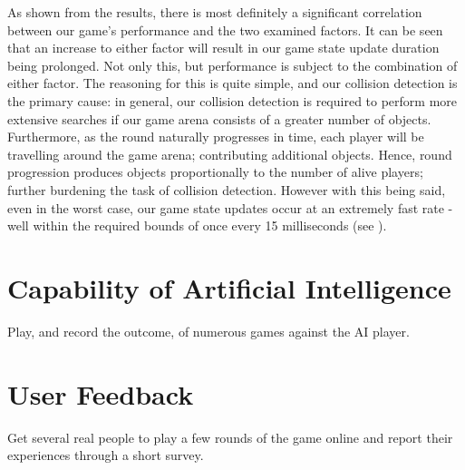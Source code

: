 \documentclass{standalone}
\begin{document}
			As shown from the results, there is most definitely a significant correlation between our game's performance and the two examined factors. It can be seen that an increase to either factor will result in our game state update duration being prolonged. Not only this, but performance is subject to the combination of either factor. The reasoning for this is quite simple, and our collision detection is the primary cause: in general, our collision detection is required to perform more extensive searches if our game arena consists of a greater number of objects. Furthermore, as the round naturally progresses in time, each player will be travelling around the game arena; contributing additional objects. Hence, round progression produces objects proportionally to the number of alive players; further burdening the task of collision detection. However with this being said, even in the worst case, our game state updates occur at an extremely fast rate - well within the required bounds of once every 15 milliseconds (see ).

	\section{Capability of Artificial Intelligence}
		Play, and record the outcome, of numerous games against the AI player.

	\section{User Feedback}
		Get several real people to play a few rounds of the game online and report their experiences through a short survey.
\end{document}
